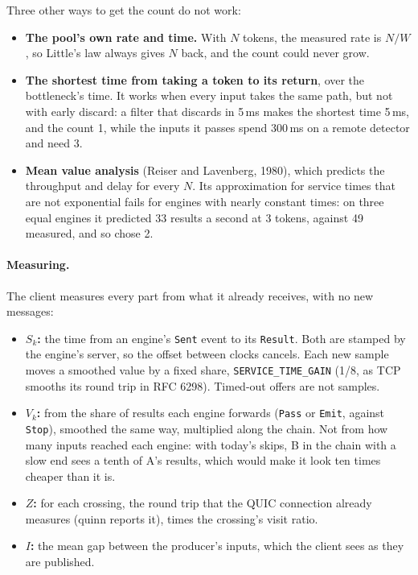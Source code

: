\documentclass[11pt]{article}
\newcommand{\code}[1]{\texttt{#1}}
\begin{document}
Three other ways to get the count do not work:
\begin{itemize}[nosep]
  \item \textbf{The pool's own rate and time.} With $N$ tokens, the measured
        rate is $N/W$, so Little's law always gives $N$ back, and the count
        could never grow.
  \item \textbf{The shortest time from taking a token to its return}, over
        the bottleneck's time. It works when every input takes the same
        path, but not with early discard: a filter that discards in 5\,ms
        makes the shortest time 5\,ms, and the count 1, while the inputs it
        passes spend 300\,ms on a remote detector and need 3.
  \item \textbf{Mean value analysis} (Reiser and Lavenberg, 1980), which
        predicts the throughput and delay for every $N$. Its approximation
        for service times that are not exponential fails for engines with
        nearly constant times: on three equal engines it predicted 33
        results a second at 3 tokens, against 49 measured, and so chose 2.
\end{itemize}

\paragraph{Measuring.} The client measures every part from what it already
receives, with no new messages:
\begin{itemize}[nosep]
  \item \textbf{$S_k$:} the time from an engine's \code{Sent} event to its
        \code{Result}. Both are stamped by the engine's server, so the
        offset between clocks cancels. Each new sample moves a smoothed
        value by a fixed share, \code{SERVICE\_TIME\_GAIN} (1/8, as TCP
        smooths its round trip in RFC 6298). Timed-out offers are not
        samples.
  \item \textbf{$V_k$:} from the share of results each engine forwards
        (\code{Pass} or \code{Emit}, against \code{Stop}), smoothed the same
        way, multiplied along the chain. Not from how many inputs reached
        each engine: with today's skips, B in the chain with a slow end sees
        a tenth of A's results, which would make it look ten times cheaper
        than it is.
  \item \textbf{$Z$:} for each crossing, the round trip that the QUIC
        connection already measures (quinn reports it), times the
        crossing's visit ratio.
  \item \textbf{$I$:} the mean gap between the producer's inputs, which the
        client sees as they are published.
\end{itemize}
\end{document}
